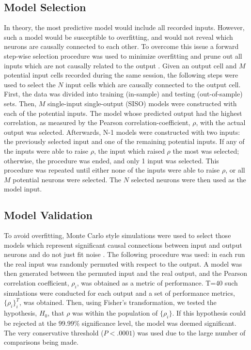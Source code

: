 \documentclass[11pt,a4paper,final]{article}
\begin{document}
    \subsection{Model Selection}
In theory, the most predictive model would include all recorded inputs.
However, such a model would be susceptible to overfitting, and would not reveal which neurons are causally connected to each other.
To overcome this issue a forward step-wise selection procedure was used to minimize overfitting and prune out all inputs which are not causally related to the output \citep{song09}.
Given an output cell and $M$ potential input cells recorded during the same session, the following steps were used to select the $N$ input cells which are causally connected to the output cell.
First, the data was divided into training (in-sample) and testing (out-of-sample) sets.
Then, $M$ single-input single-output (SISO) models were constructed with each of the potential inputs.
The model whose predicted output had the highest correlation, as measured by the Pearson correlation-coefficient, $\rho$, with the actual output was selected. Afterwards, N-1 models were constructed with two inputs: the previously selected input and one of the remaining potential inputs.
If any of the inputs were able to raise $\rho$, the input which raised $\rho$ the most was selected; otherwise, the procedure was ended, and only 1 input was selected.
This procedure was repeated until either none of the inputs were able to raise $\rho$, or all $M$ potential neurons were selected. The $N$ selected neurons were then used as the model input.

    \subsection{Model Validation}
To avoid overfitting, Monte Carlo style simulations were used to select those models which represent significant causal connections between input and output neurons and do not just fit noise \citep{zanos08}.
The following procedure was used: in each run the real input was randomly permuted with respect to the output.
A model was then generated between the permuted input and the real output, and the Pearson correlation coefficient, $\rho_{i}$, was obtained as a metric of performance.
T=40 such simulations were conducted for each output and a set of performance metrics, $\{\rho_{i}\}_{i}^{T}$, was obtained.
Then, using Fisher's transformation, we tested the hypothesis, $H_{0}$, that $\rho$ was within the population of $\{\rho_{i}\}$.
If this hypothesis could be rejected at the 99.99\% significance level, the model was deemed significant.
The very conservative threshold ($P<.0001$) was used due to the large number of comparisons being made.
\end{document}
